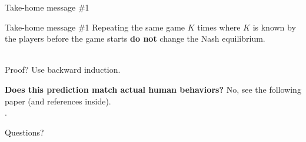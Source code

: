 \documentclass[10pt, notes]{beamer}
\begin{document}

\begin{frame}{Take-home message \#1}
    \begin{block}{Take-home message \#1}
        Repeating the same game $K$ times where $K$ is known by the players before the game starts
        \textbf{do not} change the Nash equilibrium.\\\
        
        Proof? Use backward induction.
    \end{block}

    \textbf{Does this prediction match actual human behaviors?}
    No, see the following paper (and references inside).\\
    .
\end{frame}

\begin{frame}[standout]
    Questions?
\end{frame}
\end{document}
